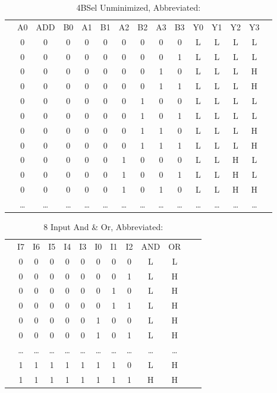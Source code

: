 \documentclass[letterpaper,titlepage,oneside]{article}
\begin{document}
\begin{table}[h!]
\begin{center}

\begin{tabular}{c|c|c|c|c|c|c|c|c|c|c|c|c|c|c}
\cline{2-14}
 & A0 & ADD & B0 & A1 & B1 & A2 & B2 & A3 & B3 & Y0 & Y1 & Y2 & Y3 &  \\ \cline{2-14}

 & 0 & 0 & 0 & 0 & 0 & 0 & 0 & 0 & 0 & L & L & L & L\\
 & 0 & 0 & 0 & 0 & 0 & 0 & 0 & 0 & 1 & L & L & L & L\\
 & 0 & 0 & 0 & 0 & 0 & 0 & 0 & 1 & 0 & L & L & L & H\\
 & 0 & 0 & 0 & 0 & 0 & 0 & 0 & 1 & 1 & L & L & L & H\\
 & 0 & 0 & 0 & 0 & 0 & 0 & 1 & 0 & 0 & L & L & L & L\\
 & 0 & 0 & 0 & 0 & 0 & 0 & 1 & 0 & 1 & L & L & L & L\\
 & 0 & 0 & 0 & 0 & 0 & 0 & 1 & 1 & 0 & L & L & L & H\\
 & 0 & 0 & 0 & 0 & 0 & 0 & 1 & 1 & 1 & L & L & L & H\\
 & 0 & 0 & 0 & 0 & 0 & 1 & 0 & 0 & 0 & L & L & H & L\\
 & 0 & 0 & 0 & 0 & 0 & 1 & 0 & 0 & 1 & L & L & H & L\\
 & 0 & 0 & 0 & 0 & 0 & 1 & 0 & 1 & 0 & L & L & H & H\\
 & \ldots{} & \ldots{} & \ldots{} & \ldots{} & \ldots{} & \ldots{} & %
\ldots{} & \ldots{} & \ldots{} & \ldots{} & \ldots{} & \ldots{} & \ldots{} &\\
\cline{2-14}
\end{tabular}
\caption{4BSel Unminimized, Abbreviated: }\label{table:4BSel_Unminimized}
\end{center}
\end{table}

\begin{table}[h!]
\begin{center}
\begin{tabular}{c|c|c|c|c|c|c|c|c|c|c|c|c}
\cline{2-11}
& I7 & I6 & I5 & I4 & I3 & I0 & I1 & I2 & AND & OR \\ 
\cline{2-11}
& 0 & 0 & 0 & 0 & 0 & 0 & 0 & 0 & L & L  \\  
& 0 & 0 & 0 & 0 & 0 & 0 & 0 & 1 & L & H \\
& 0 & 0 & 0 & 0 & 0 & 0 & 1 & 0 & L & H \\
& 0 & 0 & 0 & 0 & 0 & 0 & 1 & 1 & L & H \\
& 0 & 0 & 0 & 0 & 0 & 1 & 0 & 0 & L & H \\
& 0 & 0 & 0 & 0 & 0 & 1 & 0 & 1 & L & H \\
& \ldots{} & \ldots{} & \ldots{} & \ldots{} & \ldots{} & \ldots{} & %
\ldots{} & \ldots{} & \ldots{} & \ldots{}\\
& 1 & 1 & 1 & 1 & 1 & 1 & 1 & 0 & L & H \\
& 1 & 1 & 1 & 1 & 1 & 1 & 1 & 1 & H & H \\
\cline{2-11}
\end{tabular}
\caption{8 Input And \& Or, Abbreviated: }\label{8AndOr_Unminimized}
\end{center}
\end{table}
\end{document}
